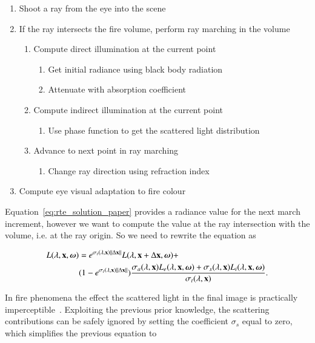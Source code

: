 \begin{enumerate}
\item Shoot a ray from the eye into the scene
\item If the ray intersects the fire volume, perform ray marching in the volume
	\begin{enumerate}
	\item Compute direct illumination at the current point
		\begin{enumerate}
		\item Get initial radiance using black body radiation
		\item Attenuate with absorption coefficient
		\end{enumerate}
	\item Compute indirect illumination at the current point
		\begin{enumerate}
		\item Use phase function to get the scattered light distribution
		\end{enumerate}
	\item Advance to next point in ray marching
		\begin{enumerate}
		\item Change ray direction using refraction index
		\end{enumerate}	
	\end{enumerate}
\item Compute eye visual adaptation to fire colour
\end{enumerate}

Equation~\ref{eq:rte_solution_paper} provides a radiance value for the next march increment, however we want to compute the value at the ray intersection with the volume, i.e. at the ray origin.
So we need to rewrite the equation as

\begin{equation}
\begin{split}
L(\lambda, \mathbf{x}, \boldsymbol{\omega}) &= e^{\sigma_t(\lambda, \mathbf{x}) \left \| \Delta \mathbf{x} \right \|} L(\lambda, \mathbf{x} + \Delta\mathbf{x}, \boldsymbol{\omega}) +  \\
& (1 - e^{\sigma_t(\lambda, \mathbf{x}) \left \| \Delta \mathbf{x} \right \|} ) \frac{\sigma_a(\lambda, \mathbf{x}) L_e(\lambda, \mathbf{x}, \boldsymbol{\omega}) + \sigma_s(\lambda, \mathbf{x}) L_i(\lambda, \mathbf{x}, \boldsymbol{\omega})}{\sigma_t(\lambda, \mathbf{x})}.
\end{split}
\end{equation}

In fire phenomena the effect the scattered light in the final image is practically imperceptible~\cite{Pegoraro:2006}.
Exploiting the previous prior knowledge, the scattering contributions can be safely ignored by setting the coefficient $\sigma_s$ equal to zero, which simplifies the previous equation to


